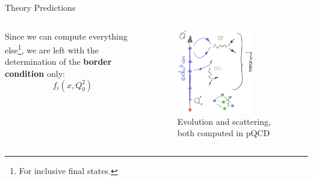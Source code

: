\documentclass[9pt]{beamer}
\begin{document}
\begin{frame}{Theory Predictions}
\begin{columns}
\begin{column}{0.5\textwidth}
            \vspace*{20pt}
            Since we can compute everything else\footnote{For inclusive final
            states.}, we are left with the determination of the
            \alert{\textbf{border condition}} only:
            \begin{equation*}
                f_i(x, Q_0^2)
            \end{equation*}
            \vspace*{5pt}
        \end{column}
        \begin{column}{0.5\textwidth}
            \begin{figure}
                \centering
                \includegraphics[width=0.7\textwidth]{evolution-scattering}
                \caption*{Evolution and scattering, both computed in pQCD}
            \end{figure}
        \end{column}
    \end{columns}
\end{frame}
\end{document}
